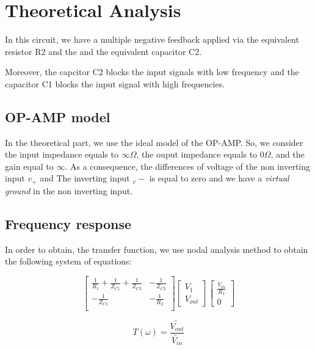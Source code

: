 \section{Theoretical Analysis}
\label{sec:analysis}

In this circuit, we have a multiple negative feedback applied via the equivalent resistor R2 and the
and the equivalent capacitor C2.

Moreover, the capcitor C2 blocks the input signals with low frequency and the capacitor C1
blocks the input signal with high frequencies.

\subsection{OP-AMP model}

In the theoretical part, we use the ideal model of the OP-AMP. So, we consider the input impedance equals to $\infty \Omega$, the ouput impedance
equals to $0 \Omega$, and the gain equal to $\infty$. As a consequence, the differences of voltage of the non inverting input $v_{+}$ and The
inverting input $_v{-}$ is equal to zero and we have a \textit{virtual ground} in the non inverting input.


\subsection{Frequency response}

In order to obtain, the transfer function, we use nodal analysis method to obtain the following system of equations:

\[
  \begin{bmatrix}
    \frac{1}{R_1} + \frac{1}{Z_{C1}} + \frac{1}{Z_{C2}} & -\frac{1}{Z_{C2}} \\
    -\frac{1}{Z_{C1}}                                   & -\frac{1}{R_2}    \\
  \end{bmatrix}
  \begin{bmatrix}
    V_{1} \\ V_{out}
  \end{bmatrix}
  \begin{bmatrix}
    \frac{V_{in}}{R_1} \\ 0
  \end{bmatrix}
\]

\hfill



\begin{equation}
  T(\omega) = \frac{\widetilde{V_{out}}}{\widetilde{V_{in}}}
  \label{frequencyR}
\end{equation}

